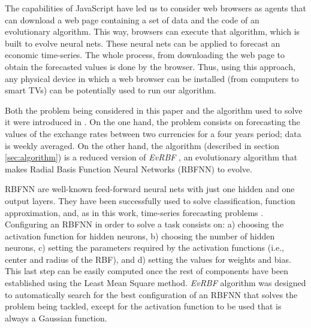 \documentclass{article}
\begin{document}
The capabilities of JavaScript have led us to consider web browsers as agents that can download a web page containing a set
of data and the code of an evolutionary algorithm. This way, browsers can execute that algorithm, which is built to evolve neural nets. These neural nets can be applied to forecast an economic time-series. The whole process, from downloading the web page to obtain the forecasted values is done by the browser. Thus, using
this approach, any physical device in which a web browser can be installed (from
computers to smart TVs) can be potentially used to run our algorithm.

Both the problem being considered in this paper and the algorithm used
to solve it were introduced in \cite{rivas03:EvRBF}. On the one hand,
the problem consists on forecasting the values of the exchange rates
between two currencies for a four years period; data is weekly averaged. %
On the other hand, the algorithm (described in
section \ref{sec:algorithm}) is a reduced version of {\em EvRBF}
\cite{rivas03:EvRBF}, an evolutionary algorithm that makes Radial Basis
Function Neural Networks (RBFNN) to evolve.

RBFNN are well-known feed-forward neural nets with just one hidden and
one output layers. %
They have been successfully used to solve classification, function
approximation, and, as in this work, time-series forecasting problems
\cite{Broomhead88,Keogh03,Whitehead}.
Configuring an RBFNN in order to solve a task consists on: a) choosing
the activation function for hidden neurons, b) choosing the number of
hidden neurons, c) setting the parameters required by the activation
functions (i.e., center and radius of the RBF), and d) setting the
values for weights and bias. This last step can be easily computed
once the rest of components have been established using the Least Mean
Square method. {\em EvRBF} algorithm was designed to automatically
search for the best configuration of an RBFNN that solves the problem
being tackled, except for the activation function to be used that is
always a Gaussian function. 
\end{document}

